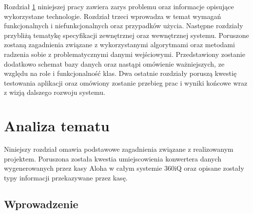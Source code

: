 \documentclass[a4paper]{book}
\begin{document}
Rozdział \ref{rozdzial2} niniejszej pracy zawiera zarys problemu oraz informacje opisujące wykorzystane technologie. Rozdział trzeci wprowadza w temat wymagań funkcjonalnych i niefunkcjonalnych oraz przypadków użycia. Następne rozdziały przybliżą tematykę specyfikacji zewnętrznej oraz wewnętrznej systemu. Poruszone zostaną zagadnienia związane z wykorzystanymi algorytmami oraz metodami radzenia sobie z problematycznymi danymi wejściowymi. Przedstawiony zostanie dodatkowo schemat bazy danych oraz nastąpi omówienie ważniejszych, ze względu na role i funkcjonalność klas. Dwa ostatnie rozdziały poruszą kwestię testowania aplikacji oraz omówiony zostanie przebieg prac i wyniki końcowe wraz z wizją dalszego rozwoju systemu. 
\chapter{Analiza tematu}
\label{rozdzial2}
Niniejszy rozdział omawia podstawowe zagadnienia związane z realizowanym projektem. Poruszona została kwestia umiejscowienia konwertera danych wygenerowanych przez kasy Aloha w całym systemie 360iQ oraz opisane zostały typy informacji przekazywane przez kasę.
\section{Wprowadzenie}
\end{document}
